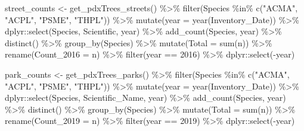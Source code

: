 \documentclass[12pt,twoside]{reedthesis}
\newenvironment{Shaded}{\begin{snugshade}}{\end{snugshade}}
\newcommand{\AttributeTok}[1]{\textcolor[rgb]{0.77,0.63,0.00}{#1}}
\newcommand{\DecValTok}[1]{\textcolor[rgb]{0.00,0.00,0.81}{#1}}
\newcommand{\FunctionTok}[1]{\textcolor[rgb]{0.00,0.00,0.00}{#1}}
\newcommand{\NormalTok}[1]{#1}
\newcommand{\OtherTok}[1]{\textcolor[rgb]{0.56,0.35,0.01}{#1}}
\newcommand{\SpecialCharTok}[1]{\textcolor[rgb]{0.00,0.00,0.00}{#1}}
\newcommand{\StringTok}[1]{\textcolor[rgb]{0.31,0.60,0.02}{#1}}
\begin{document}
\footnotesize
\begin{Shaded}
\begin{Highlighting}[]
\NormalTok{street\_counts }\OtherTok{\textless{}{-}} \FunctionTok{get\_pdxTrees\_streets}\NormalTok{() }\SpecialCharTok{\%\textgreater{}\%}
    \FunctionTok{filter}\NormalTok{(Species }\SpecialCharTok{\%in\%} \FunctionTok{c}\NormalTok{(}\StringTok{"ACMA"}\NormalTok{, }\StringTok{"ACPL"}\NormalTok{, }\StringTok{"PSME"}\NormalTok{, }\StringTok{"THPL"}\NormalTok{)) }\SpecialCharTok{\%\textgreater{}\%}
    \FunctionTok{mutate}\NormalTok{(}\AttributeTok{year =} \FunctionTok{year}\NormalTok{(Inventory\_Date)) }\SpecialCharTok{\%\textgreater{}\%}
\NormalTok{    dplyr}\SpecialCharTok{::}\FunctionTok{select}\NormalTok{(Species, Scientific, year) }\SpecialCharTok{\%\textgreater{}\%}
    \FunctionTok{add\_count}\NormalTok{(Species, year) }\SpecialCharTok{\%\textgreater{}\%}
    \FunctionTok{distinct}\NormalTok{() }\SpecialCharTok{\%\textgreater{}\%}
    \FunctionTok{group\_by}\NormalTok{(Species) }\SpecialCharTok{\%\textgreater{}\%}
    \FunctionTok{mutate}\NormalTok{(}\AttributeTok{Total =} \FunctionTok{sum}\NormalTok{(n)) }\SpecialCharTok{\%\textgreater{}\%}
    \FunctionTok{rename}\NormalTok{(}\AttributeTok{Count\_2016 =}\NormalTok{ n) }\SpecialCharTok{\%\textgreater{}\%}
    \FunctionTok{filter}\NormalTok{(year }\SpecialCharTok{==} \DecValTok{2016}\NormalTok{) }\SpecialCharTok{\%\textgreater{}\%}
\NormalTok{    dplyr}\SpecialCharTok{::}\FunctionTok{select}\NormalTok{(}\SpecialCharTok{{-}}\NormalTok{year)}

\NormalTok{park\_counts }\OtherTok{\textless{}{-}} \FunctionTok{get\_pdxTrees\_parks}\NormalTok{() }\SpecialCharTok{\%\textgreater{}\%}
    \FunctionTok{filter}\NormalTok{(Species }\SpecialCharTok{\%in\%} \FunctionTok{c}\NormalTok{(}\StringTok{"ACMA"}\NormalTok{, }\StringTok{"ACPL"}\NormalTok{, }\StringTok{"PSME"}\NormalTok{, }\StringTok{"THPL"}\NormalTok{)) }\SpecialCharTok{\%\textgreater{}\%}
    \FunctionTok{mutate}\NormalTok{(}\AttributeTok{year =} \FunctionTok{year}\NormalTok{(Inventory\_Date)) }\SpecialCharTok{\%\textgreater{}\%}
\NormalTok{    dplyr}\SpecialCharTok{::}\FunctionTok{select}\NormalTok{(Species, Scientific\_Name, year) }\SpecialCharTok{\%\textgreater{}\%}
    \FunctionTok{add\_count}\NormalTok{(Species, year) }\SpecialCharTok{\%\textgreater{}\%}
    \FunctionTok{distinct}\NormalTok{() }\SpecialCharTok{\%\textgreater{}\%}
    \FunctionTok{group\_by}\NormalTok{(Species) }\SpecialCharTok{\%\textgreater{}\%}
    \FunctionTok{mutate}\NormalTok{(}\AttributeTok{Total =} \FunctionTok{sum}\NormalTok{(n)) }\SpecialCharTok{\%\textgreater{}\%}
    \FunctionTok{rename}\NormalTok{(}\AttributeTok{Count\_2019 =}\NormalTok{ n) }\SpecialCharTok{\%\textgreater{}\%}
    \FunctionTok{filter}\NormalTok{(year }\SpecialCharTok{==} \DecValTok{2019}\NormalTok{) }\SpecialCharTok{\%\textgreater{}\%}
\NormalTok{    dplyr}\SpecialCharTok{::}\FunctionTok{select}\NormalTok{(}\SpecialCharTok{{-}}\NormalTok{year)}
\end{Highlighting}
\end{Shaded}
\end{document}
